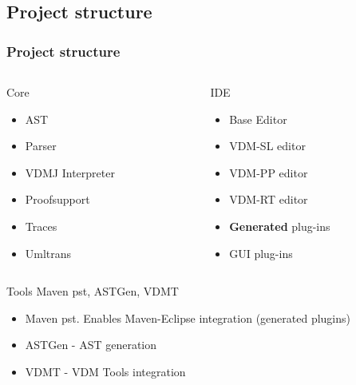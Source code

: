 \subsection{Project structure}
\frame
{
  \frametitle{Project structure}

\begin{columns}
\begin{column}{5cm}
	\begin{block}{Core}
		\begin{itemize}
			\item AST
			\item Parser
			\item VDMJ Interpreter
			\item Proofsupport
			\item Traces
			\item Umltrans
		\end{itemize}
	 \end{block}
\end{column}
\begin{column}{5cm}
\pause
	\begin{block}{IDE}
		\begin{itemize}
			\item Base Editor
			\item VDM-SL editor
			\item VDM-PP editor
			\item VDM-RT editor
			\item \textbf{Generated} plug-ins
			\item GUI plug-ins
		\end{itemize}
		
	\end{block}
\end{column}
\end{columns}
\pause
\begin{block}{Tools}
	Maven pst, ASTGen, VDMT
\end{block}

}

\note
{
\begin{itemize}
		\item Maven pst. Enables Maven-Eclipse integration (generated plugins)
		\item ASTGen - AST generation
		\item VDMT - VDM Tools integration
\end{itemize}

}

